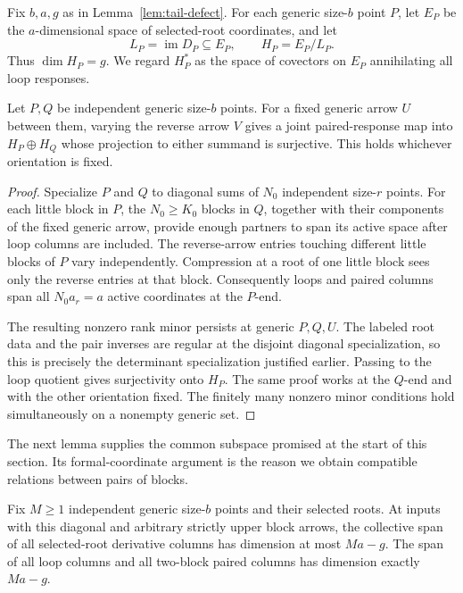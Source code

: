 Fix \(b,a,g\) as in Lemma~\ref{lem:tail-defect}. For each generic
size-\(b\) point \(P\), let \(E_P\) be the \(a\)-dimensional
space of selected-root coordinates, and let
\[
 L_P=\operatorname{im}D_P\subseteq E_P,
 \qquad H_P=E_P/L_P.
\]
Thus \(\dim H_P=g\). We regard \(H_P^*\) as the space of
covectors on \(E_P\) annihilating all loop responses.

\begin{lemma}
\label{lem:pair-quotient-surjectivity}
Let \(P,Q\) be independent generic size-\(b\) points. For a fixed
generic arrow \(U\) between them, varying the reverse arrow \(V\)
gives a joint paired-response map into \(H_P\oplus H_Q\) whose
projection to either summand is surjective. This holds whichever
orientation is fixed.
\end{lemma}

\begin{proof}
Specialize \(P\) and \(Q\) to diagonal sums of \(N_0\)
independent size-\(r\) points. For each little block in \(P\), the
\(N_0\geq K_0\) blocks in \(Q\), together with their components
of the fixed generic arrow, provide enough partners to span its
active space after loop columns are included. The reverse-arrow
entries touching different little blocks of \(P\) vary independently.
Compression at a root of one little block sees only the reverse
entries at that block. Consequently loops and paired columns span
all \(N_0a_r=a\) active coordinates at the \(P\)-end.

The resulting nonzero rank minor persists at generic \(P,Q,U\).
The labeled root data and the pair inverses are regular at the
disjoint diagonal specialization, so this is precisely the
determinant specialization justified earlier. Passing to the loop
quotient gives surjectivity onto \(H_P\). The same proof works at
the \(Q\)-end and with the other orientation fixed. The finitely
many nonzero minor conditions hold simultaneously on a nonempty
generic set.
\end{proof}

The next lemma supplies the common subspace promised at the start
of this section. Its formal-coordinate argument is the reason we
obtain compatible relations between pairs of blocks.

\begin{lemma}
\label{lem:common-tangent}
Fix \(M\geq1\) independent generic size-\(b\) points and their
selected roots. At inputs with this diagonal and arbitrary strictly
upper block arrows, the collective span of all selected-root
derivative columns has dimension at most \(Ma-g\). The span of
all loop columns and all two-block paired columns has dimension
exactly \(Ma-g\).
\end{lemma}

